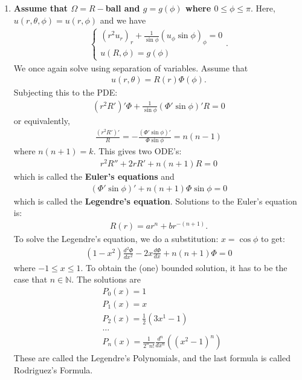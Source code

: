 \documentclass{article}
\theoremstyle{definition}
\newcommand{\f}[2]{\frac{#1}{#2}}
\newcommand{\lp}{\left(}
\newcommand{\rp}{\right)}
\begin{document}
\begin{enumerate}
	\item \textbf{Assume that $\Omega = R-$ball and $g = g(\phi)$ where $0\leq \phi \leq \pi$}. Here, $u(r,\theta,\phi) = u(r,\phi)$ and we have
	\begin{align*}
	\begin{cases}
	(r^2 u_r)_r + \f{1}{\sin\phi}( u_\phi \sin\phi)_\phi = 0\\
	u(R,\phi) = g(\phi)
	\end{cases}.
	\end{align*} 
	We once again solve using separation of variables. Assume that
	\begin{align*}
	u(r,\theta) = R(r)\Phi(\phi).
	\end{align*}  
	Subjecting this to the PDE:
	\begin{align*}
	(r^2 R')' \Phi + \f{1}{\sin\phi}(\Phi' \sin\phi )' R = 0
	\end{align*}
	or equivalently,
	\begin{align*}
	\f{(r^2 R')'}{R} = -\f{(\Phi' \sin\phi)'}{\Phi \sin\phi} = n(n-1)
	\end{align*}
	where $n(n+1) = k$. This gives two ODE's:
	\begin{align*}
	\boxed{r^2R'' + 2rR' + n(n+1)R = 0}
	\end{align*}
	which is called the \textbf{Euler's equations} and
	\begin{align*}
	\boxed{(\Phi' \sin\phi )' + n(n+1)\Phi\sin\phi = 0}
	\end{align*}
	which is called the \textbf{Legendre's equation}. Solutions to the Euler's equation is:
	\begin{align*}
	R(r) = ar^n + br^{-(n+1)}.
	\end{align*}
	To solve the Legendre's equation, we do a substitution: $x = \cos\phi$ to get:
	\begin{align*}
	\boxed{(1-x^2)\f{d^2\Phi}{dx^2} -2x\f{d\Phi}{dx} + n(n+1)\Phi = 0}
	\end{align*}
	where $-1\leq x \leq 1$. To obtain the (one) bounded solution, it has to be the case that $n\in \mathbb{N}$. The solutions are
	\begin{align*}
	&P_0(x) = 1\\
	&P_1(x) = x\\
	&P_2(x) = \f{1}{2}(3x^1 - 1)\\
	&\dots\\
	&\boxed{P_n(x) = \f{1}{2^n n!}\f{d^n}{dx^n}\lp (x^2 - 1)^n \rp}
	\end{align*} 
	These are called the Legendre's Polynomials, and the last formula is called Rodriguez's Formula. 
	

\end{enumerate}
\end{document}
